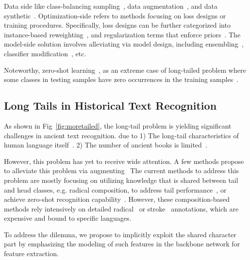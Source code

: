 Data side like class-balancing sampling~\cite{upsam}, data augmentation~\cite{cutmix}, and data synthetic~\cite{smote,hzsl}. 
Optimization-side refers to methods focusing on loss designs or training procedures. Specifically, loss designs can be further categorized into instance-based reweighting~\cite{focal,otem}, and regularization terms that enforce priors~\cite{fudanvi,sanicdar23,logvar}.
The model-side solution involves alleviating via model design, including ensembling~\cite{fle,flmoe}, classifier modification~\cite{normrob}, etc.

Noteworthy, zero-shot learning~\cite{gzsl-survey}, as an extreme case of long-tailed problem where some classes in testing samples have zero occurrences in the training samples~\cite{olt}.

\subsection{Long Tails in Historical Text Recognition}

As shown in Fig~\ref{fig:moretailed}, the long-tail problem is yielding significant challenges in ancient text recognition. 
due to 1) The long-tail characteristics of human language itself~\cite{}. 2) The number of ancient books is limited~\cite{}. 

However, this problem has yet to receive wide attention. 
A few methods propose to alleviate this problem via augmenting~\cite{aaoracle,atlt}
The current methods to address this problem are mostly focusing on utilizing knowledge that is shared between tail and head classes, e.g. radical composition, to address tail performance~\cite{obcmk2,sanicdar23,fudanvi}, or achieve zero-shot recognition capability~\cite{jinic21,gold}. However, these composition-based methods rely intensively on detailed radical~\cite{fewran} or stroke~\cite{taktak} annotations, which are expensive and bound to specific languages.

To address the dilemma, we propose to implicitly exploit the shared character part by emphasizing the modeling of such features in the backbone network for feature extraction.
